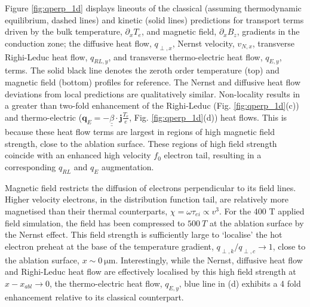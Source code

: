 \documentclass[aip,reprint]{revtex4-1}
\newcommand*{\dbul}[1]{%
	\underline{\underline{ #1}}
}
\begin{document}
 Figure \ref{fig:qperp_1d} displays lineouts  of the classical (assuming thermodynamic equilibrium, dashed lines) and kinetic (solid lines) predictions for transport terms driven by the bulk temperature, $\partial_x T_{e}$, and magnetic field, $\partial_x B_{z}$, gradients in the conduction zone; the diffusive heat flow, $q_{\perp,x}$, Nernst velocity, $v_{N,x}$, transverse Righi-Leduc heat flow, $q_{RL,y}$,  and transverse thermo-electric heat flow, $q_{E,y}$, terms. The solid black line denotes the zeroth order temperature (top) and magnetic field (bottom) profiles for reference. The Nernst and diffusive heat flow deviations from local predictions are qualitatively similar. Non-locality results in a greater than two-fold enhancement of the Righi-Leduc (Fig. \ref{fig:qperp_1d}(c)) and thermo-electric ($\mathbf{q}_{E} = -\dbul{\beta} \cdot \mathbf{j} \frac{T_e}{e}$, Fig. \ref{fig:qperp_1d}(d)) heat flows. This is because these heat flow terms are largest in regions of high magnetic field strength, close to the ablation surface. These regions of high field strength coincide with an enhanced high velocity $f_0$ electron tail, resulting in a corresponding $q_{RL}$ and $q_{E}$ augmentation. 

Magnetic field restricts the diffusion of electrons perpendicular to its field lines.   Higher velocity electrons, in the distribution function tail, are relatively more magnetised than their thermal counterparts, $\chi = \omega \tau_{ei} \propto v^3$. For the 400 T applied field simulation, the field has been compressed to $\SI{500}{T}$ at the ablation surface by the Nernst effect. This field strength is sufficiently large to `localise' the hot electron preheat at the base of the temperature gradient, $q_{\perp,k}/q_{\perp,c}\rightarrow 1$, close to the ablation surface, $x \sim \SI{0}{\micro\meter}$.  Interestingly, while the Nernst, diffusive heat flow and Righi-Leduc heat flow are effectively localised by this high field strength at $x-x_{abl} \rightarrow 0$, the thermo-electric heat flow, $q_{E,y}$,  blue line in (d) exhibits a 4 fold enhancement relative to its classical counterpart. 
\end{document}
